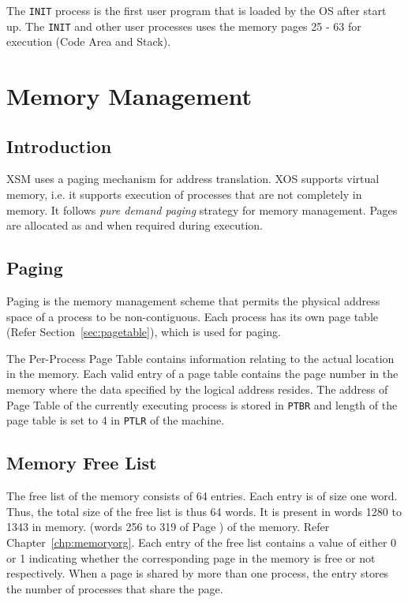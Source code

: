 \documentclass[10pt]{report}
\begin{document}
The \texttt{INIT} process is the first user program that is loaded by the OS after start up. The \texttt{INIT} and other user processes uses the memory pages 25 - 63 for execution (Code Area and Stack). 





\chapter{Memory Management}
\label{chp:memory management}
\section{Introduction}

XSM uses a paging mechanism for address translation. XOS supports virtual memory, i.e. it supports execution of processes that are not completely in memory. It follows \textit{pure demand paging} strategy for memory management. Pages are allocated as and when required during execution. 

\section{Paging}
\label{sec:paging}

Paging is the memory management scheme that permits the physical address space of a process to be non-contiguous. Each process has its own page table (Refer Section~\ref{sec:pagetable}), which is used for paging. 

 The Per-Process Page Table contains information relating to the actual location in the memory. Each valid entry of a page table contains the page number in the memory where the data specified by the logical address resides. The address of Page Table of the currently executing process is stored in \texttt{PTBR} and length of the page table is set to 4 in \texttt{PTLR} of the machine. 
 

	
\section{Memory Free List}
\label{sec:mem free list}

The free list of the memory consists of 64 entries. Each entry is of size one word. Thus, the total size of the free list is thus 64 words. It is present in words 1280 to 1343 in memory. (words 256 to 319 of Page ) of the memory. Refer Chapter~\ref{chp:memoryorg}. Each entry of the free list contains a value of either 0 or 1 indicating whether the corresponding page in the memory is free or not respectively. When a page is shared by more than one process, the entry stores the number of processes that share the page.
\end{document}
